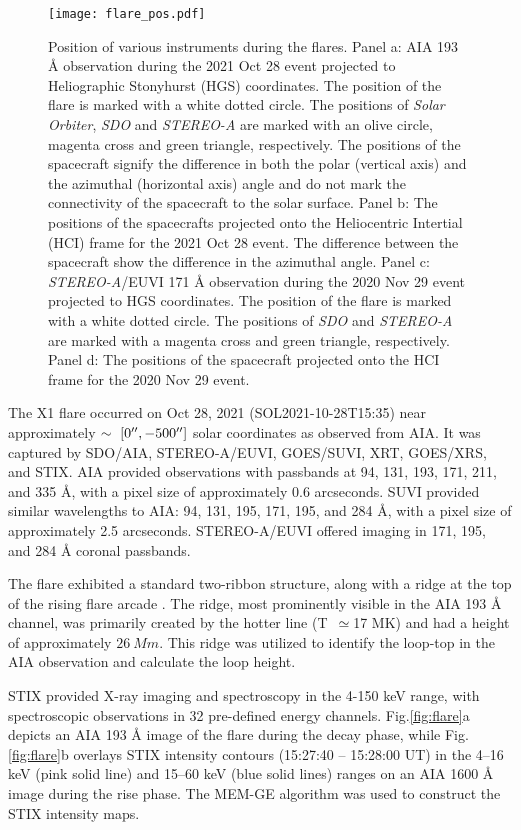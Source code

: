 \begin{figure*}[ht!]
    \centering
    \texttt{[image: flare\_pos.pdf]}
    \caption{Position of various instruments during the flares. Panel a: AIA 193 {\AA} observation during the 2021 Oct 28 event projected to Heliographic Stonyhurst (HGS) coordinates. The position of the flare is marked with a white dotted circle. The positions of {\it Solar Orbiter}, {\it SDO} and {\it STEREO-A} are marked with an olive circle, magenta cross and green triangle, respectively. The positions of the spacecraft signify the difference in both the polar (vertical axis) and the azimuthal (horizontal axis) angle and do not mark the connectivity of the spacecraft to the solar surface. Panel b: The positions of the spacecrafts projected onto the Heliocentric Intertial (HCI) frame for the 2021 Oct 28 event. The difference between the spacecraft show the difference in the azimuthal angle. Panel c: {\it STEREO-A}/EUVI 171 {\AA} observation during the 2020 Nov 29 event projected to HGS coordinates. The position of the flare is marked with a white dotted circle. The positions of {\it SDO} and {\it STEREO-A} are marked with a magenta cross and green triangle, respectively. Panel d: The positions of the spacecraft projected onto the HCI frame for the 2020 Nov 29 event.}
    \label{fig:sc_pos}
\end{figure*}

The X1 flare occurred on Oct 28, 2021 (SOL2021-10-28T15:35) near approximately $\sim~[0\hbox{$^{\prime\prime}$},-500\hbox{$^{\prime\prime}$}]$ solar coordinates as observed from AIA. It was captured by SDO/AIA, STEREO-A/EUVI, GOES/SUVI, XRT, GOES/XRS, and STIX. AIA provided observations with passbands at 94, 131, 193, 171, 211, and 335 Å, with a pixel size of approximately 0.6 arcseconds. SUVI provided similar wavelengths to AIA: 94, 131, 195, 171, 195, and 284 Å, with a pixel size of approximately 2.5 arcseconds. STEREO-A/EUVI offered imaging in 171, 195, and 284 Å coronal passbands.

The flare exhibited a standard two-ribbon structure, along with a ridge at the top of the rising flare arcade \citep{longcope22}. The ridge, most prominently visible in the AIA 193 Å channel, was primarily created by the hotter  line (T~$\simeq$17 MK) and had a height of approximately $26~Mm$. This ridge was utilized to identify the loop-top in the AIA observation and calculate the loop height.

STIX provided X-ray imaging and spectroscopy in the 4-150 keV range, with spectroscopic observations in 32 pre-defined energy channels. Fig.\ref{fig:flare}a depicts an AIA 193 Å image of the flare during the decay phase, while Fig.\ref{fig:flare}b overlays STIX intensity contours (15:27:40 {--} 15:28:00 UT) in the 4{--}16 keV (pink solid line) and 15{--}60 keV (blue solid lines) ranges on an AIA 1600 Å image during the rise phase. The MEM-GE algorithm was used to construct the STIX intensity maps.

